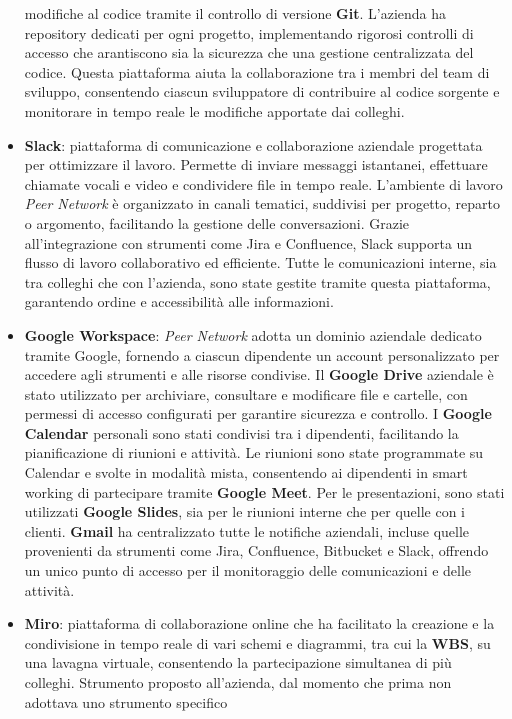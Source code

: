\begin{itemize}
    modifiche al codice tramite il controllo di versione \textbf{Git}. L'azienda ha repository dedicati per ogni progetto, implementando rigorosi controlli di accesso che
    arantiscono sia la sicurezza che una gestione centralizzata del codice. Questa piattaforma aiuta la collaborazione tra i membri del team di sviluppo, consentendo
    ciascun sviluppatore di contribuire al codice sorgente e monitorare in tempo reale le modifiche apportate dai colleghi.
    \item \textbf{Slack}: piattaforma di comunicazione e collaborazione aziendale progettata per ottimizzare il lavoro. Permette di inviare messaggi istantanei, effettuare
    chiamate vocali e video e condividere file in tempo reale. L’ambiente di lavoro \textit{Peer Network} è organizzato in canali tematici, suddivisi per progetto, reparto o argomento,
    facilitando la gestione delle conversazioni. Grazie all’integrazione con strumenti come Jira e Confluence, Slack supporta un flusso di lavoro collaborativo ed efficiente.
    Tutte le comunicazioni interne, sia tra colleghi che con l’azienda, sono state gestite tramite questa piattaforma, garantendo ordine e accessibilità alle informazioni.
    \item \textbf{Google Workspace}: \textit{Peer Network} adotta un dominio aziendale dedicato tramite Google, fornendo a ciascun dipendente un account personalizzato
    per accedere agli strumenti e alle risorse condivise. Il \textbf{Google Drive} aziendale è stato utilizzato per archiviare, consultare e modificare file e cartelle, con permessi
    di accesso configurati per garantire sicurezza e controllo. I \textbf{Google Calendar} personali sono stati condivisi tra i dipendenti, facilitando la pianificazione di riunioni
    e attività. Le riunioni sono state programmate su Calendar e svolte in modalità mista, consentendo ai dipendenti in smart working di partecipare tramite \textbf{Google Meet}.
    Per le presentazioni, sono stati utilizzati \textbf{Google Slides}, sia per le riunioni interne che per quelle con i clienti. \textbf{Gmail} ha centralizzato tutte le notifiche aziendali,
    incluse quelle provenienti da strumenti come Jira, Confluence, Bitbucket e Slack, offrendo un unico punto di accesso per il monitoraggio delle comunicazioni e delle attività.
    \item \textbf{Miro}: piattaforma di collaborazione online che ha facilitato la creazione e la condivisione in tempo reale di vari schemi e diagrammi, tra cui la \textbf{\ac{WBS}}, su una
    lavagna virtuale, consentendo la partecipazione simultanea di più colleghi. Strumento proposto all’azienda, dal momento che prima non adottava uno strumento specifico

\end{itemize}
